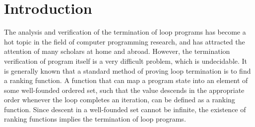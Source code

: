 \section{Introduction}
\label{intro}
The analysis and verification of the termination of loop programs has become a hot topic in the field of computer programming research, and has attracted the attention of many scholars at home and abroad\cite{cousot2012abstract}\cite{10.1145/373243.360210}\cite{urban2013abstract}. However, the termination verification of program itself is a very difficult problem, which is undecidable\cite{braverman2006termination}\cite{turing1937on}\cite{10.1007/978-3-540-27813-9_6}. It is generally known that a standard method of proving loop termination is to find a ranking function. A function that can map a program state into an element of some well-founded ordered set, such that the value descends in the appropriate order whenever the loop completes an iteration, can be defined as a ranking function. Since descent in a well-founded set cannot be infinite, the existence of ranking functions implies the termination of loop programs.

